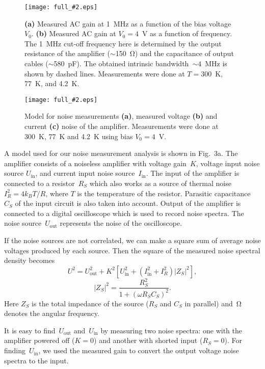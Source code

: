 \documentclass{twocol}
\newcommand{\image}[3]{
\begin{figure}[#1]
\begin{center}
\texttt{[image: full\_\#2.eps]}
\caption{\small#3}
\label{image:#2}
\end{center}
\end{figure}
}
\begin{document}
\image{h}{gain}{ {\bf (a)} Measured AC gain at 1~MHz as a function of the bias
voltage~$V_0$. {\bf (b)} Measured AC gain at $V_0 = 4$~V as a function of
frequency. The 1~MHz cut-off frequency here is determined by the output
resistance of the amplifier ($\sim$150~$\mathrm{\Omega}$) and the capacitance of
output cables ($\sim$580~pF). The obtained intrinsic bandwidth~$\sim4$~MHz
is shown by dashed lines. Measurements were done at $T=300$~K, 77~K, and 4.2~K.}

\image{h}{noise}{ Model for noise measurements {\bf (a)}, measured
voltage {\bf (b)} and current {\bf (c)} noise of the amplifier.
Measurements were done at 300~K, 77~K and 4.2~K using bias $V_0=4$~V.}

A model used for our noise measurement analysis is shown in Fig.~3a. The amplifier
consists of a noiseless amplifier with voltage gain~$K$, voltage input
noise source $U_{\mbox{in}}$, and current input noise
source~$I_{\mbox{in}}$. The input of the amplifier is connected to a
resistor~$R_S$ which also works as a source of thermal noise~$I_R^2 =
4k_BT/R$, where $T$ is the temperature of the resistor. Parasitic
capacitance~$C_S$ of the input circuit is also taken into account. Output of the
amplifier is connected to a digital oscilloscope which is used to record
noise spectra. The noise source~$U_{\mbox{out}}$ represents the noise of
the oscilloscope.

If the noise sources are not correlated, we can make a square sum of average
noise voltages produced by each source. Then the square of the measured
noise spectral density becomes
\begin{equation}\nonumber
U^2 = U_{\mbox{out}}^2 + K^2 \left[ U_{\mbox{in}}^2
   + \left(I_{\mbox{in}}^2 + I_R^2\right) |Z_S|^2 \right],
\end{equation}
$$
|Z_S|^2 = \frac{R_S^2}{1+(\omega R_S C_S)^2}.
$$
Here $Z_S$ is the total impedance of the source ($R_S$ and $C_S$ in parallel)
and~$\mathrm{\Omega}$ denotes the angular frequency.

It is easy to find~$U_{\mbox{out}}$ and~$U_{\mbox{in}}$ by measuring two
noise spectra: one with the amplifier powered off ($K=0$) and another
with shorted input ($R_S=0$). For finding~$U_{\mbox{in}}$, we used the
measured gain to convert the output voltage noise spectra to the input.
\end{document}
